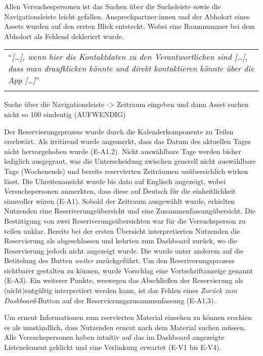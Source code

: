 Allen Versuchespersonen ist das Suchen über die Sucheleiste sowie die
Navigationsleiste leicht gefallen. Ansprechpartner:innen und der Abholort eines
Assets wurden auf den ersten Blick entsteckt. Wobei eine Raumnummer bei dem
Abholort als Fehlend dekleriert wurde. 

\begin{longtable}{p{}} \arrayrulecolor{maincolor}\hline
  \enquote{\textit{[\dots], wenn hier die Kontaktdaten zu den Verantwortlichen
    sind [\dots], dass man draufklicken könnte und direkt kontaktieren könnte
    über die App [\dots]}} \\
  \arrayrulecolor{maincolor}\hline
\end{longtable}

Suche über die Navigationsleiste -> Zeitraum eingeben und dann Asset suchen
nicht so 100 eindeutig (AUFWENDIG)

Der Reservierungsprozess wurde durch die Kalenderkomponente zu Teilen erschwärt.
Als irritirend wurde angemerkt, dass das Datum des aktuellen Tages nicht
hervorgehoben wurde (E-A1,2). Nicht auswählbare Tage werden bisher lediglich
ausgegraut, was die Unterscheidung zwischen generell nicht auswählbare Tage
(Wochenende) und bereits reservierten Zeiträumen unübersichlich wirken lässt.
Die Uhreitenansicht wurde bis dato auf Englisch angezeigt, wobei
Versuchspersonen anmerkten, dass diese auf Deutsch für die einheitlichkeit
sinnvoller wären (E-A1). Sobald der Zeitraum ausgewählt wurde, erhielten
Nutzenden eine Reseriverungsübersicht und eine Zusammenfassungübersicht. Die
Bestätigung von zwei Reseriverungsübersichten war für die Versuchsperson zu
teilen unklar. Bereits bei der ersten Übersicht interpretierten Nutzenden die
Reservierung als abgeschlossen und kehrten zum Dashboard zurück, wo die
Reservierung jedoch nicht angezeigt wurde. Die wurde unter anderem auf die
Betitelung des Butten \textit{weiter} zurückgeführt. Um den Reseriverungsprozess
sichtbarer gestalten zu können, wurde Vorschlag eine Vortschriftanzeige genannt
(E-A3). Ein weiterer Punkte, weswegen das Abschließen der Reservierung als
(nicht)entgültig interpretiert werden kann, ist das Fehlen eines \textit{Zurück
zum Dashboard}-Button auf der Reservierungszusammenfassung (E-A1,3).

Um erneut Informationen zum rservierten Material einsehen zu können erschien es
als umständlich, dass Nutzenden erneut nach dem Material suchen müssen. Alle
Versuchspersonen haben intuitiv auf das im Dashboard angezeigte Listenelement
geklickt  und eine Verlinkung erwartet (E-V1 bis E-V4). 

